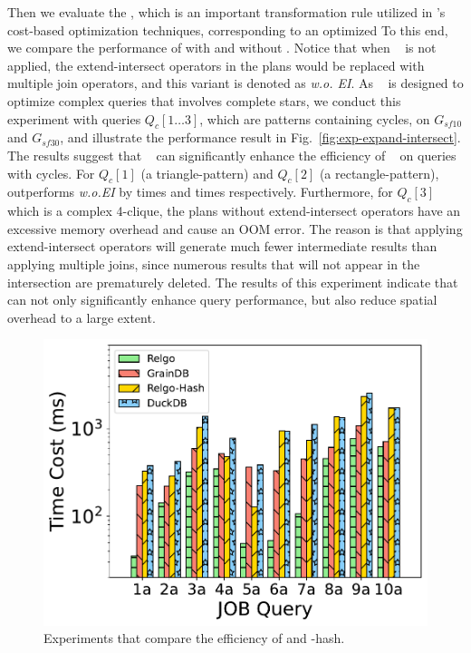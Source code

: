 Then we evaluate the \expandintersectrule, which is an important transformation rule utilized in \name's cost-based optimization techniques, corresponding to an optimized 
To this end, we compare the performance of \name with and without \expandintersectrule.
Notice that when \expandintersectrule~ is not applied, the extend-intersect operators in the plans would be replaced with multiple join operators, and this variant is denoted as \textit{\name w.o. EI}.
As \expandintersectrule~ is designed to optimize complex queries that involves complete stars, we conduct this experiment with queries $Q_c[1\ldots 3]$, which are patterns containing cycles, on $G_{sf10}$ and $G_{sf30}$, and illustrate the performance result in Fig.~\ref{fig:exp-expand-intersect}.
The results suggest that \expandintersectrule~ can significantly enhance the efficiency of \name~ on queries with cycles. 
For $Q_c[1]$ (a triangle-pattern) and $Q_c[2]$ (a rectangle-pattern), \name outperforms \textit{\name w.o.EI} by  times and  times respectively.
Furthermore, for $Q_c[3]$ which is a complex 4-clique, the plans without extend-intersect operators have an excessive memory overhead and cause an OOM error.
The reason is that applying extend-intersect operators will generate much fewer intermediate results than applying multiple joins, since numerous results that will not appear in the intersection are prematurely deleted.
The results of this experiment indicate that \expandintersectrule can not only significantly enhance query performance, but also reduce spatial overhead to a large extent.

\begin{figure}[ht]
    \centering
    \includegraphics[width=.9\linewidth]{./figures/exp/hash_plan_job.pdf}
    \caption{Experiments that compare the efficiency of \name and \name-hash.}
    \label{fig:exp-hash-plan}
\end{figure}

